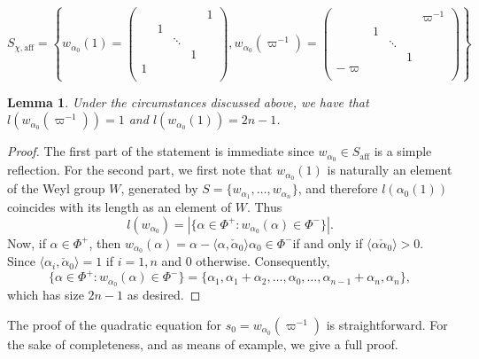 \documentclass{article}
\newcommand{\aff}{\mathrm{aff}}
\newcommand{\calpha}{\check{\alpha}}
\theoremstyle{plain}
\newtheorem{lemma}[theorem]{Lemma}
\theoremstyle{definition}
\begin{document}
    \begin{equation*}
        S_{\chi,\aff}=\left\{w_{\alpha_0}(1)=\begin{pmatrix}
            &&&&1\\
            &1&&&\\
            &&\ddots&&\\
            &&&1&\\
            1&&&&\\
        \end{pmatrix}, w_{\alpha_0}(\varpi^{-1})=\begin{pmatrix}
            &&&&\varpi^{-1}\\
            &1&&&\\
            &&\ddots&&\\
            &&&1&\\
            -\varpi&&&&\\
        \end{pmatrix}\right\}
    \end{equation*}

    \begin{lemma}
        Under the circumstances discussed above, we have that $l(w_{\alpha_0}(\varpi^{-1}))=1$ and $l(w_{\alpha_0}(1))=2n-1$.
    \end{lemma}
    \begin{proof}
        The first part of the statement is immediate since $w_{\alpha_0}\in S_{\aff}$ is a simple reflection. For the second part, we first note that $w_{\alpha_0}(1)$ is naturally an element of the Weyl group $W$, generated by $S=\{w_{\alpha_1},\ldots,w_{\alpha_n}\}$, and therefore $l(\alpha_0(1))$ coincides with its length as an element of $W$. Thus
        $$l(w_{\alpha_0})=|\{\alpha\in\Phi^+:w_{\alpha_0}(\alpha)\in\Phi^-\}|.$$
        Now, if $\alpha\in\Phi^+$, then $w_{\alpha_0}(\alpha)=\alpha-\langle\alpha,\calpha_0\rangle\alpha_0\in\Phi^-$if and only if $\langle\alpha\calpha_0\rangle>0$. Since $\langle\alpha_i,\calpha_0\rangle=1$ if $i=1,n$ and $0$ otherwise. Consequently, 
        $$\{\alpha\in\Phi^+:w_{\alpha_0}(\alpha)\in\Phi^-\}=\{\alpha_1,\alpha_1+\alpha_2,\ldots,\alpha_0,\ldots,\alpha_{n-1}+\alpha_n,\alpha_n\},$$
        which has size $2n-1$ as desired.
    \end{proof}

    The proof of the quadratic equation for $s_0=w_{\alpha_0}(\varpi^{-1})$ is straightforward. For the sake of completeness, and as means of example, we give a full proof.
    
\end{document}
